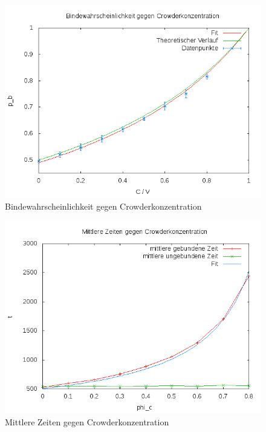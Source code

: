 \documentclass[bachelor,       %
               twoside,        %
               BCOR10mm,       %
               english,ngerman, %
               ]{GAUBM}
\begin{document}
\begin{figure}
  \centering
  \includegraphics[width=0.9\linewidth]{ProbgegenCrowder.png}
  \caption{Bindewahrscheinlichkeit gegen Crowderkonzentration}
  \label{fig:ProbGegenCrowder}
\end{figure}

\begin{figure}
  \centering
  \includegraphics[width=0.9\linewidth]{meantimes.png}
  \caption{Mittlere Zeiten gegen Crowderkonzentration}
  \label{fig:mean}
\end{figure}


\cleardoublepage



\end{document}
